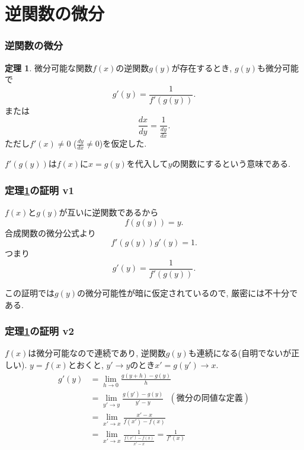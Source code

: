 \documentclass[dvipdfmx,cjk,10.2pt]{beamer}
\theoremstyle{definition}
\newtheorem{Thm}{定理}[section]
\begin{document}

\section{逆関数の微分}


\begin{frame}
\frametitle{逆関数の微分}

\begin{Thm} \label{逆関数の微分定理}
微分可能な関数$f(x)$の逆関数$g(y)$が存在するとき, $g(y)$も微分可能で
$$
g'(y)= \frac{1}{f'(g(y))}. 
$$
または
$$
\frac{dx}{dy}=\frac{1}{\frac{dy}{dx}}. 
$$
ただし$f'(x)\neq 0$ ($\frac{dy}{dx} \neq0$)を仮定した. 
\end{Thm}
$f'(g(y))$は$f(x)$に$x=g(y)$を代入して$y$の関数にするという意味である. 



\end{frame}






\begin{frame}
\frametitle{定理\ref{逆関数の微分定理}の証明 v1}

$f(x)$と$g(y)$が互いに逆関数であるから
$$
f(g(y))=y. 
$$
合成関数の微分公式より
$$
f'(g(y))g'(y)=1. 
$$
つまり
$$
g'(y)= \frac{1}{f'(g(y))}. 
$$

この証明では$g(y)$の微分可能性が暗に仮定されているので, 厳密には不十分である. 

\end{frame}





\begin{frame}
\frametitle{定理\ref{逆関数の微分定理}の証明 v2}

$f(x)$は微分可能なので連続であり, 逆関数$g(y)$も連続になる(自明でないが正しい). 
$y=f(x)$とおくと, $y'\to y$のとき$x'=g(y')\to x$.  
\begin{align*}
g'(y) &= \lim_{h\to 0}\frac{g(y+h)-g(y)}{h} \\
&= \lim_{y'\to y}\frac{g(y')-g(y)}{y'-y} \ \ \  (\text{微分の同値な定義})\\
& = \lim_{x'\to x} \frac{x'-x}{f(x')-f(x)} \\
& = \lim_{x'\to x} \frac{1}{\frac{f(x')-f(x)}{x'-x}} = \frac{1}{f'(x)}
\end{align*}


\end{frame}
\end{document}

